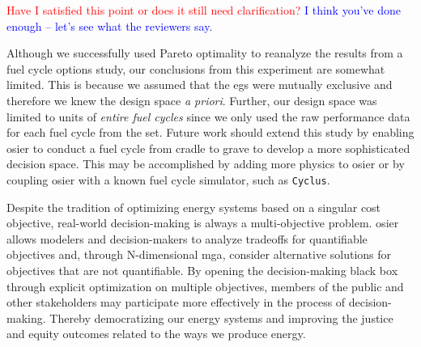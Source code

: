 \textcolor{red}{Have I satisfied this point or does it still need clarification?}
\textcolor{blue}{I think you've done enough -- let's see what the reviewers 
say.}

Although we successfully used Pareto optimality to reanalyze the results from 
a fuel cycle options study, our conclusions from this experiment are somewhat 
limited. This is because we assumed that the \glspl{eg} were mutually exclusive
and therefore we knew the design space \textit{a priori}. Further, our design space
was limited to units of \textit{entire fuel cycles} since we only used the raw 
performance data for each fuel cycle from the \gls{set}. Future work should 
extend this study by enabling \gls{osier} to conduct a fuel cycle from cradle to 
grave to develop a more sophisticated decision space. This may be accomplished
by adding more physics to \gls{osier} or by coupling \gls{osier} with a known 
fuel cycle simulator, such as \texttt{Cyclus}\cite{huff_fundamental_2016}.

Despite the tradition of optimizing energy systems based on a singular cost
objective, real-world decision-making is always a multi-objective problem.
\gls{osier} allows modelers and decision-makers to analyze tradeoffs for 
quantifiable objectives and, through N-dimensional \gls{mga}, consider
alternative solutions for objectives that are not quantifiable. By opening
the decision-making black box through explicit optimization on multiple objectives,
members of the public and other stakeholders may participate more effectively 
in the process of decision-making. Thereby democratizing our energy systems and improving
the justice and equity outcomes related to the ways we produce energy.
